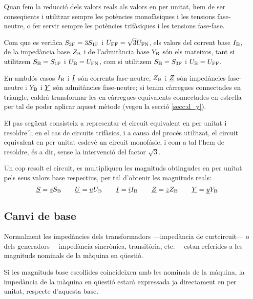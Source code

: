  Quan fem la reducció dels valors reals als valors en per unitat, hem de ser conseqüents i utilitzar sempre les potències monofàsiques i les tensions fase-neutre, o fer servir sempre les potències trifàsiques i les tensions fase-fase.

 Com que es verifica $S_\mathrm{3F}=3 S_\mathrm{1F}$ i $U_\mathrm{FF}=\sqrt{3}U_\mathrm{FN}$, els valors  del corrent base $I_\mathrm{B}$, de la impedància base $Z_\mathrm{B}$ i  de l'admitància base $Y_\mathrm{B}$ són els mateixos, tant si utilitzem $S_\mathrm{B}=S_\mathrm{1F}$ i $U_\mathrm{B}=U_\mathrm{FN}$, com si utilitzem $S_\mathrm{B}=S_\mathrm{3F}$ i $U_\mathrm{B}=U_\mathrm{FF}$.

 En ambdós casos $I_\mathrm{B}$ i $\underline{I}$ són corrents fase-neutre, $Z_\mathrm{B}$ i $\underline{Z}$ són impedàncies  fase-neutre i $Y_\mathrm{B}$ i $\underline{Y}$ són admitàncies fase-neutre; si tenim càrregues connectades en triangle, caldrà transformar-les en càrregues equivalents connectades en estrella per tal de poder aplicar aquest mètode (vegeu la secció \ref{secc:d_y}).

El pas següent consisteix a representar el circuit equivalent en
per unitat i resoldre'l; en el cas de circuits trifàsics, i a causa del procés utilitzat, el circuit equivalent en per unitat esdevé un circuit monofàsic, i com a tal l'hem de resoldre, és a dir, sense la intervenció del factor $\sqrt{3}$.

Un cop resolt el circuit, es multipliquen les magnituds obtingudes en per unitat pels
seus valors base respectius, per tal d'obtenir les magnituds reals:
\begin{equation}
   \underline{S} = \underline{s} S_\mathrm{B} \qquad \underline{U} = \underline{u} U_\mathrm{B} \qquad \underline{I} = \underline{i} I_\mathrm{B} \qquad \underline{Z} = \underline{z} Z_\mathrm{B} \qquad \underline{Y} = \underline{y} Y_\mathrm{B}
\end{equation}

\subsection{Canvi de base}\label{sec:canvi-base} 

Normalment les impedàncies dels transformadors ---impedància de curtcircuit--- o dels generadors ---impedància sincrònica, transitòria, etc.--- estan referides a les magnituds nominals de la màquina en qüestió.


Si les magnituds base escollides coincideixen amb les nominals de la màquina,
la impedància de la màquina en qüestió estarà expressada ja directament en per unitat, respecte d'aquesta base.

